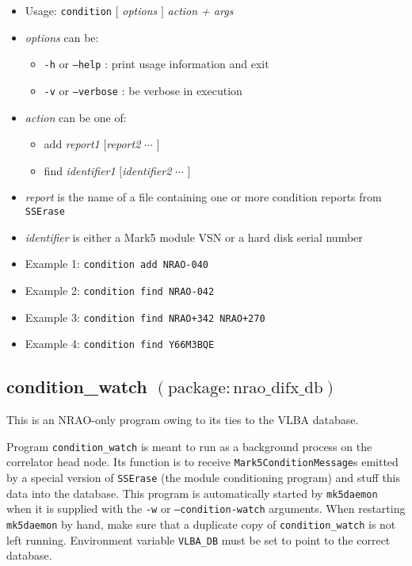 \begin{itemize}
\item[] Usage: {\tt condition} $[$ {\em options} $]$ {\em action + args}
\item[] {\em options} can be:
\begin{itemize}
\item[] {\tt -h} or {\tt --help} : print usage information and exit
\item[] {\tt -v} or {\tt --verbose} : be verbose in execution
\end{itemize}
\item[] {\em action} can be one of:
\begin{itemize}
\item[] add {\em report1} $[${\em report2} $\cdots$ $]$
\item[] find {\em identifier1} $[${\em identifier2} $\cdots$ $]$
\end{itemize}
\item[] {\em report} is the name of a file containing one or more condition reports from {\tt SSErase}
\item[] {\em identifier} is either a Mark5 module VSN or a hard disk serial number
\item[] Example 1: {\tt condition add NRAO-040}
\item[] Example 2: {\tt condition find NRAO-042}
\item[] Example 3: {\tt condition find NRAO+342 NRAO+270}
\item[] Example 4: {\tt condition find Y66M3BQE}
\end{itemize}








\subsection{condition\_watch {\small $\mathrm{(package: nrao\_difx\_db)}$}}

This is an NRAO-only program owing to its ties to the VLBA database.

Program {\tt condition\_watch} is meant to run as a background process on the correlator head node.
Its function is to receive {\tt Mark5ConditionMessage}s emitted by a special version of {\tt SSErase} (the module conditioning program) and stuff this data into the database.
This program is automatically started by {\tt mk5daemon} when it is supplied with the {\tt -w} or {\tt --condition-watch} arguments.
When restarting {\tt mk5daemon} by hand, make sure that a duplicate copy of {\tt condition\_watch} is not left running.
Environment variable {\tt VLBA\_DB} must be set to point to the correct database.

